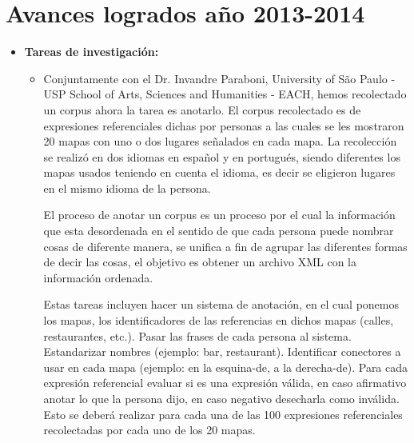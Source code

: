 \section{Avances logrados a\~no 2013-2014 }
\label{progreso}

\begin{itemize}
\item \textbf{Tareas de investigaci\'on:}
\begin{itemize}

\item Conjuntamente con el Dr. Invandre Paraboni, University of S\~ao Paulo - USP 
School of Arts, Sciences and Humanities - EACH, hemos recolectado un corpus ahora la tarea es anotarlo. El corpus recolectado es de expresiones referenciales dichas por personas a las cuales se les mostraron 20 mapas con uno o dos lugares se\~nalados en cada mapa. La recolecci\'on se realiz\'o en dos idiomas en espa\~nol y en portugu\'es, siendo diferentes los mapas usados teniendo en cuenta el idioma, es decir se eligieron lugares en el mismo idioma de la persona.

El proceso de anotar un corpus es un proceso por el cual la informaci\'on que esta desordenada en el sentido de que cada persona puede nombrar cosas de diferente manera, se unifica a fin de agrupar las diferentes formas de decir las cosas, el objetivo es obtener un archivo XML con la informaci\'on ordenada.

 Estas tareas incluyen hacer un sistema de anotaci\'on, en el cual ponemos los mapas, los identificadores de las referencias en dichos mapas (calles, restaurantes, etc.). Pasar las frases de cada persona al sistema. Estandarizar nombres (ejemplo: bar, restaurant). Identificar conectores a usar en cada mapa (ejemplo: en la esquina-de, a la derecha-de). Para cada expresi\'on referencial evaluar si es una expresi\'on v\'alida, en caso afirmativo anotar lo que la persona dijo, en caso negativo desecharla como inv\'alida. Esto se deber\'a realizar para cada una de las 100 expresiones referenciales recolectadas por cada uno de los 20 mapas.
 

\end{itemize}
\end{itemize}
